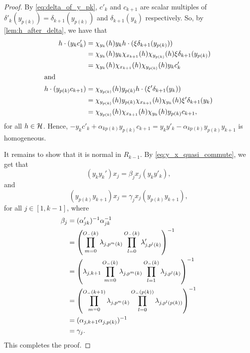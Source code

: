 \begin{proof}
	By \cref{eq:delta_of_y_pk}, $c'_k$ and $c_{k+1}$ are scalar multiples of $\delta'_k
		(y_{p(k)}) = \delta_{k+1}(y_{p(k)})$ and $\delta_{k+1}(y_k)$ respectively. So, by
	\cref{lem:h_after_delta}, we have that
	\begin{align*}
		h \cdot (y_k c'_k)        & = \chi_{y_k}(h)y_k h \cdot (\xi \delta_{k+1}(y_{p(k)}))                              \\
		                          & = \chi_{y_k}(h)y_k \chi_{x_{k+1}}(h) \chi_{y_{p(k)}}(h)\xi \delta_{k+1}(y_{p(k)})    \\
		                          & = \chi_{y_k}(h)\chi_{x_{k+1}}(h)\chi_{y_{p(k)}}(h) y_k c'_k                          \\
		\shortintertext{and}
		h \cdot (y_{p(k)}c_{k+1}) & = \chi_{y_{p(k)}}(h) y_{p(k)} h \cdot (\xi' \delta_{k+1}(y_k))                       \\
		                          & = \chi_{y_{p(k)}}(h)y_{p(k)}  \chi_{x_{k+1}}(h) \chi_{y_k}(h) \xi' \delta_{k+1}(y_k) \\
		                          & = \chi_{y_{p(k)}}(h)  \chi_{x_{k+1}}(h) \chi_{y_k}(h) y_{p(k)}c_{k+1},
	\end{align*}
	for all $h \in \mathcal{H}$. Hence, $-y_k c'_k + \alpha_{kp(k)}y_{p(k)}c_{k+1} = y_k y'_k -
		\alpha_{kp(k)}y_{p(k)}y_{k+1}$ is homogeneous.

	It remains to show that it is normal in $R_{k-1}$. By \cref{eq:y_x_quasi_commute}, we
	get that
	\begin{equation*}
		(y_k y_k')x_j = \beta_j x_j (y_k y'_k),
	\end{equation*}
	and
	\begin{equation*}
		(y_{p(k)}y_{k+1})x_j = \gamma_j x_j (y_{p(k)}y_{k+1}),
	\end{equation*}
	for all $j \in [1, k-1]$, where
	\begin{align*}
		\beta_j & = (\alpha'_{jk})^{-1} \alpha_{jk} ^{-1}                                                                                   \\
		        & = \left(\prod_{m = 0}^{O_{-}(k)}\lambda_{j,p^m (k)} \prod_{l=0}^{O_{-}(k)}\lambda'_{j,p^l(k)}\right)^{-1}                \\
		        & = \left(\lambda_{j, k+1}\prod_{m = 0}^{O_{-}(k)}\lambda_{j,p^m (k)} \prod_{l=1}^{O_{-}(k)}\lambda_{j,p^l(k)}\right)^{-1} \\
		        & = \left(\prod_{m = 0}^{O_{-}(k+1)}\lambda_{j,p^m (k)} \prod_{l=0}^{O_{-}(p(k))}\lambda_{j,p^l(p(k))}\right)^{-1}         \\
		        & = (\alpha_{j,k+1} \alpha_{j, p(k)})^{-1}                                                                                 \\
		        & = \gamma_j.
	\end{align*}
	This completes the proof.
\end{proof}

